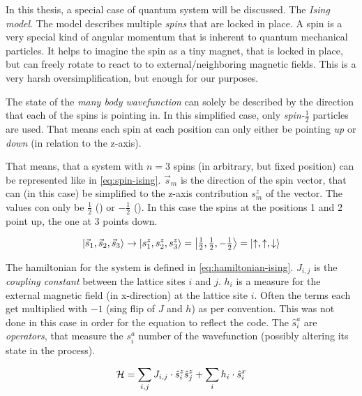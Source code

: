 In this thesis, a special case of quantum system will be discussed. 
The \emph{Ising model}.
The model describes multiple \emph{spins} that are locked in place. 
A spin is a very special kind of angular momentum that is inherent to quantum mechanical particles.
It helps to imagine the spin as a tiny magnet, that is locked in place, but can freely rotate to react to to external/neighboring  magnetic fields. This is a very harsh oversimplification, but enough for our purposes.

The state of the \emph{many body wavefunction} can solely be described by the direction that each of the spins is pointing in. In this simplified case, only \emph{spin-$\frac{1}{2}$} particles are used. That means each spin at each position can only either be pointing \emph{up} \up or \emph{down} \down (in relation to the z-axis).

That means, that a system with $n=3$ spins (in arbitrary, but fixed position) can be represented like in \autoref{eq:spin-ising}. $\vec{s}_m$ is the direction of the spin vector, that can (in this case) be simplified to the z-axis contribution $s^z_m$ of the vector. The values con only be $\frac{1}{2}$ (\up) or $-\frac{1}{2}$ (\down).
In this case the spins at the positions 1 and 2 point up, the one at 3 points down.

\begin{equation}
    \label{eq:spin-ising}
    \ket{\vec{s}_1, \vec{s}_2, \vec{s}_3} \rightarrow \ket{s^z_{1}, s^z_{2}, s^z_{3}} = \ket{\tfrac{1}{2}, \tfrac{1}{2}, -\tfrac{1}{2}} = \ket{\uparrow, \uparrow, \downarrow}
\end{equation}

The hamiltonian for the system is defined in \autoref{eq:hamiltonian-ising}. $J_{i, j}$ is the \emph{coupling constant} between the lattice sites $i$ and $j$. $h_i$ is a measure for the external magnetic field (in x-direction) at the lattice site $i$. Often the terms each get multiplied with $-1$ (sing flip of $J$ and $h$) as per convention. This was not done in this case in order for the equation to reflect the code. The $\hat{s}^a_i$ are \emph{operators}, that measure the $s^a_i$ number of the wavefunction (possibly altering its state in the process).

\begin{equation}
    \label{eq:hamiltonian-ising}
    \mathcal{H} = \sum\limits_{i, j} J_{i, j} \cdot \hat{s}^z_i \hat{s}^z_j + \sum\limits_{i} h_i \cdot \hat{s}^x_i
\end{equation}

